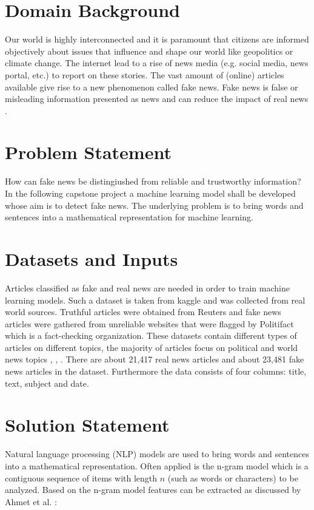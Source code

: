 \documentclass[a4paper,12pt,nottoc]{article}
\begin{document}
\section*{Domain Background}

Our world is highly interconnected and it is paramount that citizens are informed objectively about issues that influence and shape our world like geopolitics or climate change. The internet lead to a rise of news media (e.g. social media, news portal, etc.) to report on these stories. The vast amount of (online) articles available give rise to a new phenomenon called fake news. Fake news is false or misleading information presented as news and can reduce the impact of real news \cite{bib:fakenews}.

\section*{Problem Statement}

How can fake news be distingiushed from reliable and trustworthy information? In the following capstone project a machine learning model shall be developed whose aim is to detect fake news. The underlying problem is to bring words and sentences into a mathematical representation for machine learning.

\section*{Datasets and Inputs}

Articles classified as fake and real news are needed in order to train machine learning models. Such a dataset is taken from kaggle \cite{bib:kaggle} and was collected from real world sources. Truthful articles were obtained from Reuters and fake news articles were gathered from unreliable websites that were flagged by Politifact which is a fact-checking organization. These datasets contain different types of articles on different topics, the majority of articles focus on political and world news topics \cite{bib:isot}, \cite{bib:ahmed-2018}, \cite{bib:ahmed-2017}. There are about 21,417 real news articles and about 23,481 fake news articles in the dataset. Furthermore the data consists of four columns: title, text, subject and date.

\section*{Solution Statement}

Natural language processing (NLP) models are used to bring words and sentences into a mathematical representation. Often applied is the n-gram model which is a contiguous sequence of items with length $n$ (such as words or characters) to be analyzed. Based on the n-gram model features can be extracted as discussed by Ahmet et al. \cite{bib:ahmed-2018}:
 
\end{document}
